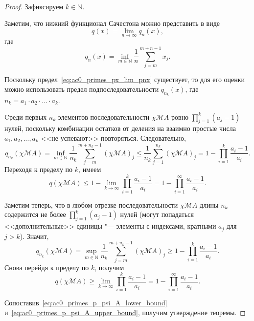 \documentclass[a4paper,openbib]{article}
\renewcommand{\leq}{\leqslant}
\renewcommand{\geq}{\geqslant} %
\theoremstyle{definition}
\begin{document}
\begin{proof}
	Зафиксируем $k\in\mathbb{N}$.

	Заметим, что нижний функционал Сачестона можно представить в виде
	\begin{equation}
		\label{eq:ac0_primes_px_lim_pnx}
		q(x) = \lim_{n\to\infty} q_n(x)
		,
	\end{equation}
	где
	\begin{equation}
		q_n(x) = \inf_{m\in\mathbb{N}}  \frac{1}{n} \sum_{j=m}^{m+n-1} x_j
		.
	\end{equation}

	Поскольку предел~\eqref{eq:ac0_primes_px_lim_pnx} существует, то для его оценки можно использовать предел подпоследовательности
	$q_{n_k}(x)$, где $n_k = a_1\cdot a_2 \cdot ... \cdot a_k$.


	Cреди первых $n_k$ элементов последовательности $\chi\mathscr{M}A$
	ровно $\prod_{j=1}^k (a_j-1)$ нулей, поскольку комбинации остатков от деления
	на взаимно простые числа $a_1, a_2, ..., a_k$ <<не успевают>> повторяться.
	Следовательно,
	\begin{equation}
		q_{n_k}(\chi\mathscr{M}A) =
		\inf_{m\in\mathbb{N}}  \frac{1}{n_k} \sum_{j=m}^{m+n_k-1} (\chi\mathscr{M}A)_j
		\leq
		\frac{1}{n_k} \sum_{j=1}^{n_k} (\chi\mathscr{M}A)_j
		=
		1-\prod_{i=1}^k \frac{a_i-1}{a_i}
		.
	\end{equation}
	Переходя к пределу по $k$, имеем
	\begin{equation}
		\label{eq:ac0_primes_p_psi_A_lower_bound}
		q(\chi\mathscr{M}A) \leq 1-\lim_{k\to \infty} \prod_{i=1}^k \frac{a_i-1}{a_i}
		=
		1-\prod_{i=1}^\infty \frac{a_i-1}{a_i}
		.
	\end{equation}

	Заметим теперь, что в любом отрезке последовательности $\chi\mathscr{M}A$ длины $n_k$
	содержится не более $\prod_{j=1}^k (a_j-1)$ нулей
	(могут попадаться <<дополнительные>> единицы "--- элементы с индексами, кратными $a_j$ для $j>k$).
	Значит,
	\begin{equation}
		q_{n_k}(\chi\mathscr{M}A) =
		\sup_{m\in\mathbb{N}}  \frac{1}{n_k} \sum_{j=m}^{m+n_k-1} (\chi\mathscr{M}A)_j
		\geq
		1-\prod_{i=1}^k \frac{a_i-1}{a_i}
		.
	\end{equation}
	Снова перейдя к пределу по $k$, получим
	\begin{equation}
		\label{eq:ac0_primes_p_psi_A_upper_bound}
		q(\chi\mathscr{M}A) \geq \lim_{k\to \infty} \prod_{i=1}^k \frac{a_i-1}{a_i}
		=
		1-\prod_{i=1}^\infty \frac{a_i-1}{a_i}
		.
	\end{equation}

	Сопоставив~\eqref{eq:ac0_primes_p_psi_A_lower_bound} и~\eqref{eq:ac0_primes_p_psi_A_upper_bound}, получим утверждение теоремы.
\end{proof}
\end{document}
